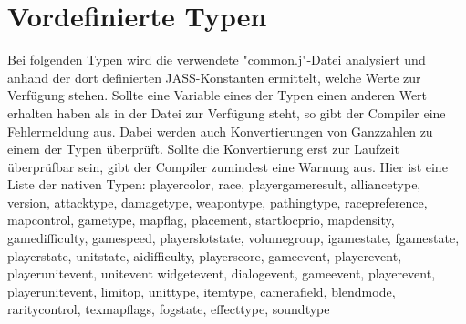 \section{Vordefinierte Typen}
Bei folgenden Typen wird die verwendete "common.j"-Datei analysiert und anhand der dort definierten JASS-Konstanten
ermittelt, welche Werte zur Verfügung stehen. Sollte eine Variable eines der Typen einen anderen Wert erhalten
haben als in der Datei zur Verfügung steht, so gibt der Compiler eine Fehlermeldung aus.
Dabei werden auch Konvertierungen von Ganzzahlen zu einem der Typen überprüft. Sollte die Konvertierung erst zur
Laufzeit überprüfbar sein, gibt der Compiler zumindest eine Warnung aus.
Hier ist eine Liste der nativen Typen:
playercolor, race, playergameresult, alliancetype, version, attacktype, damagetype, weapontype, pathingtype, racepreference,
mapcontrol, gametype, mapflag, placement, startlocprio, mapdensity, gamedifficulty, gamespeed, playerslotstate, volumegroup,
igamestate, fgamestate, playerstate, unitstate, aidifficulty, playerscore, gameevent, playerevent, playerunitevent, unitevent
widgetevent, dialogevent, gameevent, playerevent, playerunitevent, limitop, unittype, itemtype, camerafield, blendmode, raritycontrol,
texmapflags, fogstate, effecttype, soundtype 